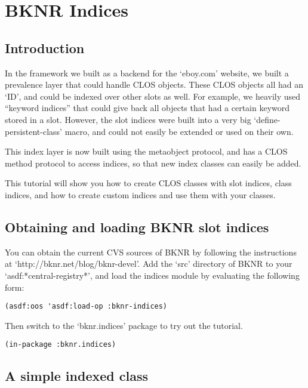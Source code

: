 \chapter{BKNR Indices}

\section{ Introduction}

In the framework we built as a backend for the `eboy.com' website,
we built a prevalence layer that could handle CLOS objects. These
CLOS objects all had an `ID', and could be indexed over other
slots as well. For example, we heavily used ``keyword indices'' that
could give back all objects that had a certain keyword stored in a
slot. However, the slot indices were built into a very big
`define-persistent-class' macro, and could not easily be extended
or used on their own.

This index layer is now built using the metaobject protocol, and
has a CLOS method protocol to access indices, so that new index
classes can easily be added.

This tutorial will show you how to create CLOS classes with slot
indices, class indices, and how to create custom indices and use
them with your classes.


\section{ Obtaining and loading BKNR slot indices}

You can obtain the current CVS sources of BKNR by following the
instructions at `http://bknr.net/blog/bknr-devel'. Add the `src'
directory of BKNR to your `asdf:*central-registry*', and load the
indices module by evaluating the following form:

\begin{Verbatim}[fontsize=\small,frame=leftline,framerule=0.9mm,rulecolor=\color{gray},framesep=5.1mm,xleftmargin=5mm,fontfamily=cmtt]
(asdf:oos 'asdf:load-op :bknr-indices)
\end{Verbatim}
Then switch to the `bknr.indices' package to try out the tutorial.

\begin{Verbatim}[fontsize=\small,frame=leftline,framerule=0.9mm,rulecolor=\color{gray},framesep=5.1mm,xleftmargin=5mm,fontfamily=cmtt]
(in-package :bknr.indices)
\end{Verbatim}


\section{ A simple indexed class}




